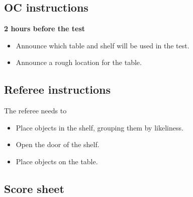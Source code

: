 \newpage
\subsection{OC instructions}

\textbf{2 hours before the test}
\begin{itemize}
	\item Announce which table and shelf will be used in the test.
	\item Announce a rough location for the table.
\end{itemize}

\subsection{Referee instructions}
The referee needs to
\begin{itemize}
	\item Place objects in the shelf, grouping them by likeliness.
	\item Open the door of the shelf.
	\item Place objects on the table.
\end{itemize}


\newpage
\subsection{Score sheet}


